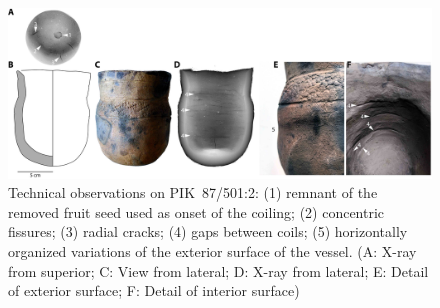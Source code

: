 \documentclass[smallextended,natbib]{svjour3}       %
\begin{document}
\begin{figure}[!tb]
	\centering
	\includegraphics[width=\textwidth]{mt_PIK87-501_2-01.jpg}
	\caption{Technical observations on PIK~87/501:2: (1) remnant of the removed fruit seed used as onset of the coiling; (2) concentric fissures; (3) radial cracks; (4) gaps between coils; (5) horizontally organized variations of the exterior surface of the vessel. (A: X-ray from superior; C: View from lateral; D: X-ray from lateral; E: Detail of exterior surface; F: Detail of interior surface)}
	\label{fig:PIK87_501_2_macrotraces}
\end{figure}
\end{document}

